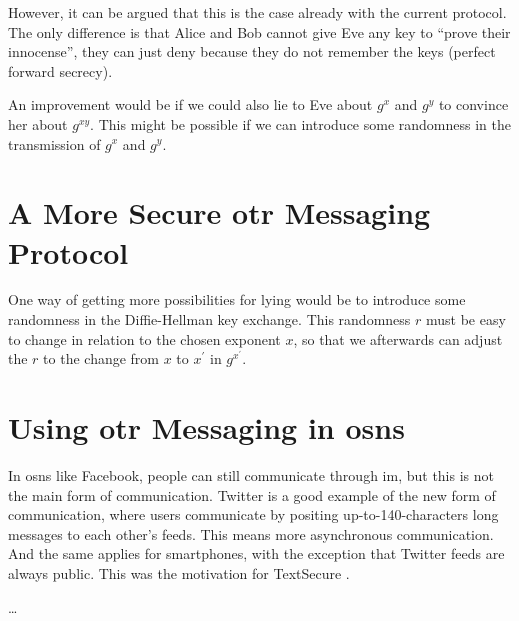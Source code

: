\documentclass[draft]{llncs}
\begin{document}
However, it can be argued that this is the case already with the current 
protocol.
The only difference is that Alice and Bob cannot give Eve any key to 
\enquote{prove their innocense}, they can just deny because they do not 
remember the keys (perfect forward secrecy).

An improvement would be if we could also lie to Eve about \(g^x\) and \(g^y\) 
to convince her about \(g^{xy}\).
This might be possible if we can introduce some randomness in the transmission 
of \(g^x\) and \(g^y\).


\section{A More Secure \acs{otr} Messaging Protocol}

One way of getting more possibilities for lying would be to introduce some 
randomness in the Diffie-Hellman key exchange.
This randomness \(r\) must be easy to change in relation to the chosen exponent 
\(x\), so that we afterwards can adjust the \(r\) to the change from \(x\) to 
\(x^\prime\) in \(g^{x^\prime}\).


\section{Using \acs{otr} Messaging in \acsp{osn}}

In \acp{osn} like Facebook, people can still communicate through \ac{im}, but 
this is not the main form of communication.
Twitter is a good example of the new form of communication, where users 
communicate by positing up-to-140-characters long messages to each other's 
feeds.
This means more asynchronous communication.
And the same applies for smartphones, with the exception that Twitter feeds are 
always public.
This was the motivation for TextSecure \cite{TSasynch}.

\dots


\printbibliography
\end{document}
